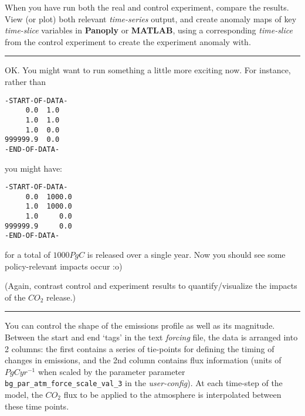 When you have run both the real and control experiment, compare the results. View (or plot) both relevant \textit{time-series} output, and create anomaly maps of key \textit{time-slice} variables in \textbf{Panoply} or \textbf{MATLAB}, using a corresponding \textit{time-slice} from the control experiment to create the experiment anomaly with.

\vspace{1mm}
\noindent\rule{4cm}{0.1mm}
\vspace{2mm}

\noindent OK. You might want to run something a little more exciting now. For instance, rather than
\vspace{-2pt}\small\begin{verbatim}
-START-OF-DATA-
     0.0  1.0
     1.0  1.0
     1.0  0.0
999999.9  0.0
-END-OF-DATA-
\end{verbatim}\normalsize\vspace{-2pt}
you might have:
\vspace{-2pt}\small\begin{verbatim}
-START-OF-DATA-
     0.0  1000.0
     1.0  1000.0
     1.0     0.0
999999.9     0.0
-END-OF-DATA-
\end{verbatim}\normalsize\vspace{-2pt}
for a total of \(1000 PgC\) is released over a single year. Now you should see some policy-relevant impacts occur :o)

\noindent (Again, contrast control and experiment results to quantify/visualize the impacts of the \(CO_{2}\) release.)

\vspace{1mm}
\noindent\rule{4cm}{0.1mm}
\vspace{2mm}

\noindent You can control the shape of the emissions profile as well as its magnitude. Between the start and end ‘tags’ in the text \textit{forcing} file, the data is arranged into 2 columns: the first contains a series of tie-points for defining the timing of changes in emissions, and the 2nd column contains flux information (units of \(PgC yr^{-1}\) when scaled by the parameter parameter \texttt{bg\_par\_atm\_force\_scale\_val\_3} in the \textit{user-config}). At each time-step of the model, the \(CO_{2}\) flux to be applied to the atmosphere is interpolated between these time points.

\vspace{1mm}

